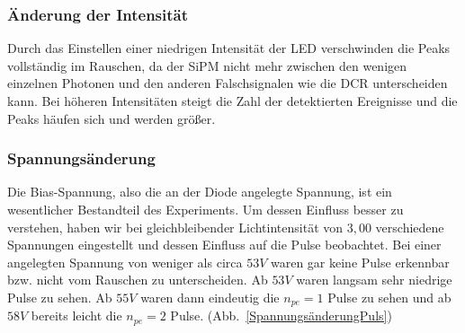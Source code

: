 \documentclass[12pt]{article}
\begin{document}
\subsubsection{Änderung der Intensität}
Durch das Einstellen einer niedrigen Intensität der LED verschwinden die Peaks vollständig im Rauschen, da der SiPM nicht mehr zwischen den wenigen einzelnen Photonen und den anderen Falschsignalen wie die DCR unterscheiden kann.
Bei höheren Intensitäten steigt die Zahl der detektierten Ereignisse und die Peaks häufen sich und werden größer.


\subsubsection{Spannungsänderung}
Die Bias-Spannung, also die an der Diode angelegte Spannung, ist ein wesentlicher Bestandteil des Experiments.
Um dessen Einfluss besser zu verstehen, haben wir bei gleichbleibender Lichtintensität von $3,00$ verschiedene Spannungen eingestellt und dessen Einfluss auf die Pulse beobachtet.
Bei einer angelegten Spannung von weniger als circa $53V$ waren gar keine Pulse erkennbar bzw. nicht vom Rauschen zu unterscheiden.
Ab $53V$ waren langsam sehr niedrige Pulse zu sehen.
Ab $55V$ waren dann eindeutig die $n_{pe}=1$ Pulse zu sehen und ab $58V$ bereits leicht die $n_{pe}=2$ Pulse.
(Abb.~\ref{SpannungsänderungPuls})
\end{document}
